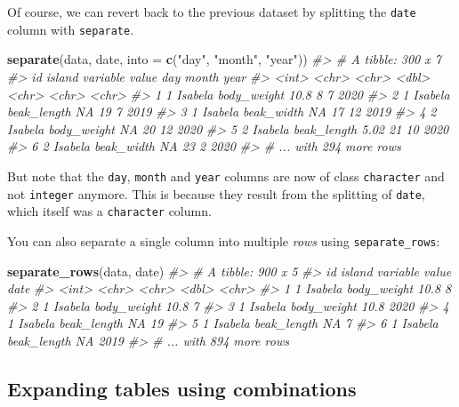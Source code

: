 \documentclass[]{book}
\newenvironment{Shaded}{}{}
\newcommand{\CommentTok}[1]{\textcolor[rgb]{0.38,0.63,0.69}{\textit{#1}}}
\newcommand{\DataTypeTok}[1]{\textcolor[rgb]{0.56,0.13,0.00}{#1}}
\newcommand{\KeywordTok}[1]{\textcolor[rgb]{0.00,0.44,0.13}{\textbf{#1}}}
\newcommand{\NormalTok}[1]{#1}
\newcommand{\StringTok}[1]{\textcolor[rgb]{0.25,0.44,0.63}{#1}}
\begin{document}
Of course, we can revert back to the previous dataset by splitting the \texttt{date} column with \texttt{separate}.

\begin{Shaded}
\begin{Highlighting}[]
\KeywordTok{separate}\NormalTok{(data, date, }\DataTypeTok{into =} \KeywordTok{c}\NormalTok{(}\StringTok{"day"}\NormalTok{, }\StringTok{"month"}\NormalTok{, }\StringTok{"year"}\NormalTok{))}
\CommentTok{#> # A tibble: 300 x 7}
\CommentTok{#>      id island  variable    value day   month year }
\CommentTok{#>   <int> <chr>   <chr>       <dbl> <chr> <chr> <chr>}
\CommentTok{#> 1     1 Isabela body_weight 10.8  8     7     2020 }
\CommentTok{#> 2     1 Isabela beak_length NA    19    7     2019 }
\CommentTok{#> 3     1 Isabela beak_width  NA    17    12    2019 }
\CommentTok{#> 4     2 Isabela body_weight NA    20    12    2020 }
\CommentTok{#> 5     2 Isabela beak_length  5.02 21    10    2020 }
\CommentTok{#> 6     2 Isabela beak_width  NA    23    2     2020 }
\CommentTok{#> # ... with 294 more rows}
\end{Highlighting}
\end{Shaded}

But note that the \texttt{day}, \texttt{month} and \texttt{year} columns are now of class \texttt{character} and not \texttt{integer} anymore. This is because they result from the splitting of \texttt{date}, which itself was a \texttt{character} column.

You can also separate a single column into multiple \emph{rows} using \texttt{separate\_rows}:

\begin{Shaded}
\begin{Highlighting}[]
\KeywordTok{separate_rows}\NormalTok{(data, date)}
\CommentTok{#> # A tibble: 900 x 5}
\CommentTok{#>      id island  variable    value date }
\CommentTok{#>   <int> <chr>   <chr>       <dbl> <chr>}
\CommentTok{#> 1     1 Isabela body_weight  10.8 8    }
\CommentTok{#> 2     1 Isabela body_weight  10.8 7    }
\CommentTok{#> 3     1 Isabela body_weight  10.8 2020 }
\CommentTok{#> 4     1 Isabela beak_length  NA   19   }
\CommentTok{#> 5     1 Isabela beak_length  NA   7    }
\CommentTok{#> 6     1 Isabela beak_length  NA   2019 }
\CommentTok{#> # ... with 894 more rows}
\end{Highlighting}
\end{Shaded}

\hypertarget{expanding-tables-using-combinations}{%
\subsection{Expanding tables using combinations}\label{expanding-tables-using-combinations}}
\end{document}
